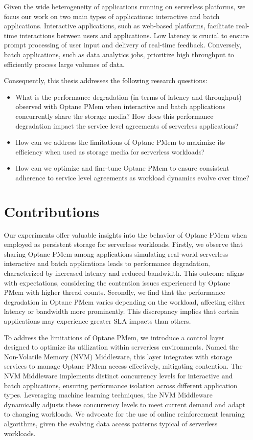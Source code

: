 Given the wide heterogeneity of applications running on serverless platforms, we focus our work on two main types of applications: interactive and batch applications. Interactive applications, such as web-based platforms, facilitate real-time interactions between users and applications. Low latency is crucial to ensure prompt processing of user input and delivery of real-time feedback. Conversely, batch applications, such as data analytics jobs, prioritize high throughput to efficiently process large volumes of data.

Consequently, this thesis addresses the following research questions:

\begin{itemize}
    \item What is the performance degradation (in terms of latency and throughput) observed with Optane PMem when interactive and batch applications concurrently share the storage media? How does this performance degradation impact the service level agreements of serverless applications?
    \item How can we address the limitations of Optane PMem to maximize its efficiency when used as storage media for serverless workloads?
    \item How can we optimize and fine-tune Optane PMem to ensure consistent adherence to service level agreements as workload dynamics evolve over time?
\end{itemize}

\section{Contributions}

Our experiments offer valuable insights into the behavior of Optane PMem when employed as persistent storage for serverless workloads. Firstly, we observe that sharing Optane PMem among applications simulating real-world serverless interactive and batch applications leads to performance degradation, characterized by increased latency and reduced bandwidth. This outcome aligns with expectations, considering the contention issues experienced by Optane PMem with higher thread counts. Secondly, we find that the performance degradation in Optane PMem varies depending on the workload, affecting either latency or bandwidth more prominently. This discrepancy implies that certain applications may experience greater SLA impacts than others.

To address the limitations of Optane PMem, we introduce a control layer designed to optimize its utilization within serverless environments. Named the Non-Volatile Memory (NVM) Middleware, this layer integrates with storage services to manage Optane PMem access effectively, mitigating contention. The NVM Middleware implements distinct concurrency levels for interactive and batch applications, ensuring performance isolation across different application types. Leveraging machine learning techniques, the NVM Middleware dynamically adjusts these concurrency levels to meet current demand and adapt to changing workloads. We advocate for the use of online reinforcement learning algorithms, given the evolving data access patterns typical of serverless workloads.

